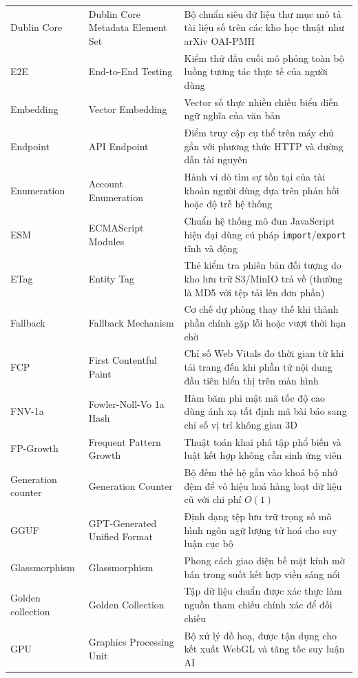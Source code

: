 {\begin{longtable}{@{}>{\raggedright\arraybackslash}p{3.4cm}>{\raggedright\arraybackslash}p{4.7cm}>{\raggedright\arraybackslash}p{7.15cm}@{}}
    Dublin Core & Dublin Core Metadata Element Set & Bộ chuẩn siêu dữ liệu thư mục mô tả tài liệu số trên các kho học thuật như arXiv OAI-PMH \\
    E2E & End-to-End Testing & Kiểm thử đầu cuối mô phỏng toàn bộ luồng tương tác thực tế của người dùng \\
    Embedding & Vector Embedding & Vector số thực nhiều chiều biểu diễn ngữ nghĩa của văn bản \\
    Endpoint & API Endpoint & Điểm truy cập cụ thể trên máy chủ gắn với phương thức HTTP và đường dẫn tài nguyên \\
    Enumeration & Account Enumeration & Hành vi dò tìm sự tồn tại của tài khoản người dùng dựa trên phản hồi hoặc độ trễ hệ thống \\
    ESM & ECMAScript Modules & Chuẩn hệ thống mô đun JavaScript hiện đại dùng cú pháp \texttt{import}/\texttt{export} tĩnh và động \\
    ETag & Entity Tag & Thẻ kiểm tra phiên bản đối tượng do kho lưu trữ S3/MinIO trả về (thường là MD5 với tệp tải lên đơn phần) \\
    Fallback & Fallback Mechanism & Cơ chế dự phòng thay thế khi thành phần chính gặp lỗi hoặc vượt thời hạn chờ \\
    FCP & First Contentful Paint & Chỉ số Web Vitals đo thời gian từ khi tải trang đến khi phần tử nội dung đầu tiên hiển thị trên màn hình \\
    FNV-1a & Fowler-Noll-Vo 1a Hash & Hàm băm phi mật mã tốc độ cao dùng ánh xạ tất định mã bài báo sang chỉ số vị trí không gian 3D \\
    FP-Growth & Frequent Pattern Growth & Thuật toán khai phá tập phổ biến và luật kết hợp không cần sinh ứng viên \\
    Generation counter & Generation Counter & Bộ đếm thế hệ gắn vào khoá bộ nhớ đệm để vô hiệu hoá hàng loạt dữ liệu cũ với chi phí $O(1)$ \\
    GGUF & GPT-Generated Unified Format & Định dạng tệp lưu trữ trọng số mô hình ngôn ngữ lượng tử hoá cho suy luận cục bộ \\
    Glassmorphism & Glassmorphism & Phong cách giao diện bề mặt kính mờ bán trong suốt kết hợp viền sáng nổi \\
    Golden collection & Golden Collection & Tập dữ liệu chuẩn được xác thực làm nguồn tham chiếu chính xác để đối chiếu \\
    GPU & Graphics Processing Unit & Bộ xử lý đồ hoạ, được tận dụng cho kết xuất WebGL và tăng tốc suy luận AI \\

\end{longtable}}
